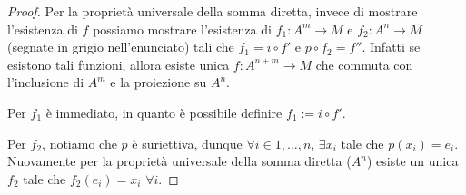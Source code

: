 \begin{proof}{}
    Per la proprietà universale della somma diretta, invece di mostrare
    l'esistenza di \(f\) possiamo mostrare l'esistenza di \(f_{1} : A^{m} \to
    M\) e \(f_{2} : A^{n} \to M\) (segnate in grigio nell'enunciato) tali che
    \(f_{1} = i \circ f'\) e \(p \circ f_{2} = f''\). Infatti se esistono tali
    funzioni, allora esiste unica \(f : A^{n+m} \to M\) che commuta con
    l'inclusione di \(A^{m}\) e la proiezione su \(A^{n}\).

    Per \(f_{1}\) è immediato, in quanto è possibile definire \(f_{1} := i \circ
    f'\).

    Per \(f_{2}\), notiamo che \(p\) è suriettiva, dunque \(\forall i \in {1,
    \dots, n}\), \(\exists x_{i}\) tale che \(p{(x_{i})} = e_{i}\). Nuovamente
    per la proprietà universale della somma diretta (\(A^{n}\)) esiste un unica
    \(f_{2}\) tale che \(f_{2}{(e_{i})} = x_{i}\) \(\forall i\).

\end{proof}

